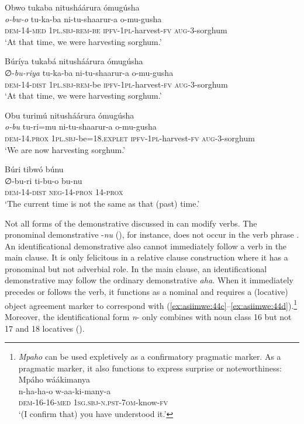 \documentclass[output=paper 		  ]{langscibook}
\begin{document}
\ea%
    \label{ex:asiimwe:43}
    \ea\label{ex:asiimwe:43a}  Obwo tukaba nitusháárura ómugúsha\\
    \gll \emph{o-bw-o}  tu-ka-ba  ni-tu-shaarur-a  o-mu-gusha\\
    \textsc{dem-14-med}  \textsc{1pl.sbj-rem-be}  \textsc{ipfv-1pl-}harvest-\textsc{fv}  \textsc{aug}{}-3-sorghum\\
    \glt ‘At that time, we were harvesting sorghum.’

  \ex\label{ex:asiimwe:43b}  Búríya tukabá nitusháárura ómugúsha\\
    \gll ∅-\emph{bu-riya}  tu-ka-ba  ni-tu-shaarur-a  o-mu-gusha    \\
    \textsc{dem-}14-\textsc{dist}  \textsc{1pl.sbj-rem}{}-be  \textsc{ipfv-1pl-}harvest-\textsc{fv}  \textsc{aug}{}-3-sorghum\\
    \glt ‘At that time, we were harvesting sorghum.’

  \ex\label{ex:asiimwe:43c}  Obu turimú nitusháárura ómugúsha\\
    \gll \emph{o-bu}  tu-ri=mu  ni-tu-shaarur-a  o-mu-gusha\\
    \textsc{dem}{}-14.\textsc{prox}  \textsc{1pl.sbj-}be=18.\textsc{explet}  \textsc{ipfv}{}-1\textsc{pl}{}-harvest-\textsc{fv}  \textsc{aug}{}-3-sorghum\\
    \glt ‘We are now harvesting sorghum.’

  \ex\label{ex:asiimwe:43d}  Búri tibwó búnu\\
\gll ∅-bu-ri  ti-bu-o  bu-nu\\
\textsc{dem}{}-14-\textsc{dist}  \textsc{neg-14-pron}  \textsc{14-prox}\\
\glt     ‘The current time is not the same as that (past) time.’
    \z
\z

Not all forms of the demonstrative discussed in  can modify verbs. The pronominal demonstrative -\textit{nu} (), for instance, does not occur in the verb phrase . An identificational demonstrative also cannot immediately follow a verb in the main clause. It is only felicitous in a relative clause construction  where it has a pronominal but not adverbial role. In the main clause, an identificational demonstrative may follow the ordinary demonstrative \textit{aha.} When it immediately precedes or follows the verb, it functions as a nominal and requires a (locative) object agreement marker to correspond with (\ref{ex:asiimwe:44c}--\ref{ex:asiimwe:44d}).\footnote{\textit{Mpaho}
    can be used expletively as a confirmatory pragmatic marker. As a pragmatic marker, it also functions to express surprise or noteworthiness:
  \ea
  Mpáho wáákimanya\\
  \gll n-ha-ha-o  w-aa-ki-many-a\\
  \textsc{dem-16-16-med}   \textsc{1sg.sbj-n.pst-7om}-know-\textsc{fv}\\
  \glt ‘(I confirm that) you have understood it.’
  \z}
Moreover, the identificational form \textit{n}{}- only combines with noun class 16 but not 17 and 18 locatives ().
\end{document}
